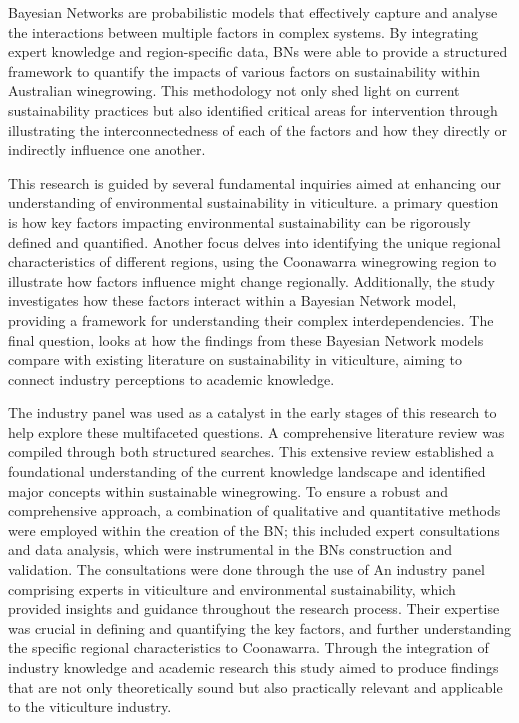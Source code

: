 Bayesian Networks are probabilistic models that effectively capture and analyse the interactions between multiple factors in complex systems. By integrating expert knowledge and region-specific data, BNs were able to provide a structured framework to quantify the impacts of various factors on sustainability within Australian winegrowing. This methodology not only shed light on current sustainability practices but also identified critical areas for intervention through illustrating the interconnectedness of each of the factors and how they directly or indirectly influence one another.

This research is guided by several fundamental inquiries aimed at enhancing our understanding of environmental sustainability in viticulture. a primary question is how key factors impacting environmental sustainability can be rigorously defined and quantified. Another focus delves into identifying the unique regional characteristics of different regions, using the Coonawarra winegrowing region to illustrate how factors influence might change regionally. Additionally, the study investigates how these factors interact within a Bayesian Network model, providing a framework for understanding their complex interdependencies. The final question, looks at how the findings from these Bayesian Network models compare with existing literature on sustainability in viticulture, aiming to connect industry perceptions to academic knowledge.

The industry panel was used as a catalyst in the early stages of this research to help explore these multifaceted questions. A comprehensive literature review was compiled through both structured searches. This extensive review established a foundational understanding of the current knowledge landscape and identified major concepts within sustainable winegrowing. To ensure a robust and comprehensive approach, a combination of qualitative and quantitative methods were employed within the creation of the BN; this included expert consultations and data analysis, which were instrumental in the BNs construction and validation. The consultations were done through the use of An industry panel comprising experts in viticulture and environmental sustainability, which provided insights and guidance throughout the research process. Their expertise was crucial in defining and quantifying the key factors, and further understanding the specific regional characteristics to Coonawarra. Through the integration of industry knowledge and academic research this study aimed to produce findings that are not only theoretically sound but also practically relevant and applicable to the viticulture industry.

